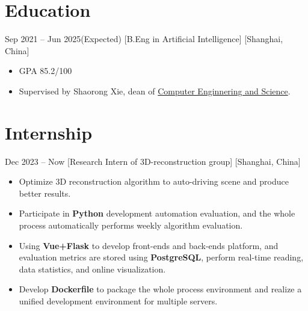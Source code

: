 \documentclass{chicv}
\begin{document}
\begin{basicinfo}
\end{basicinfo}


\section{Education}
  {Sep 2021 -- Jun 2025(Expected)}
  [B.Eng in Artificial Intelligence]
  [Shanghai, China]
  \begin{itemize}
    \item GPA 85.2/100
    \item Supervised by Shaorong Xie, dean of \href{https://cs.shu.edu.cn/}{Computer Enginnering and Science}.
  \end{itemize}



\section{Internship}
{Dec 2023 -- Now}
  [Research Intern of 3D-reconstruction group]
  [Shanghai, China]
  \begin{itemize}
    \item Optimize 3D reconstruction algorithm to auto-driving scene and produce better results.
    \item Participate in \textbf{Python} development automation evaluation, and the whole process automatically performs weekly algorithm evaluation.
    \item Using \textbf{Vue+Flask} to develop front-ends and back-ends platform, and evaluation metrics are stored using \textbf{PostgreSQL}, perform real-time reading, data statistics, and online visualization.
    \item Develop \textbf{Dockerfile} to package the whole process environment and realize a unified development environment for multiple servers.
  \end{itemize}
\end{document}
